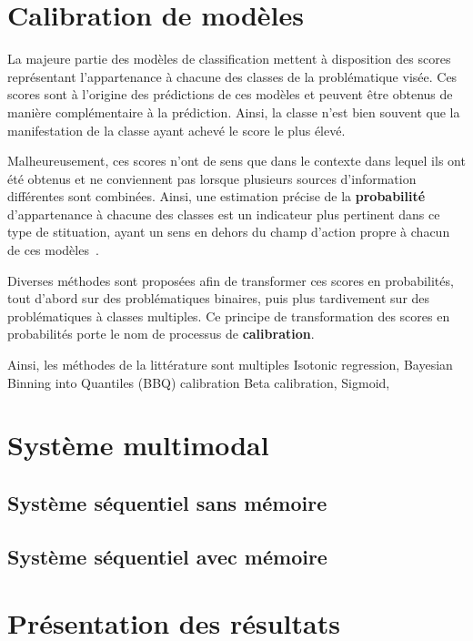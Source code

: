 \section{Calibration de modèles}
La majeure partie des modèles de classification mettent à disposition des scores représentant l'appartenance à chacune des classes de la problématique visée. Ces scores sont à l'origine des prédictions de ces modèles et peuvent être obtenus de manière complémentaire à la prédiction. Ainsi, la classe n'est bien souvent que la manifestation de la classe ayant achevé le score le plus élevé.\par

Malheureusement, ces scores n'ont de sens que dans le contexte dans lequel ils ont été obtenus et ne conviennent pas lorsque plusieurs sources d'information différentes sont combinées. Ainsi, une estimation précise de la \textbf{probabilité} d'appartenance à chacune des classes est un indicateur plus pertinent dans ce type de stituation, ayant un sens en dehors du champ d'action propre à chacun de ces modèles~\cite{Zadrozny2002}.\par

Diverses méthodes sont proposées afin de transformer ces scores en probabilités, tout d'abord sur des problématiques binaires, puis plus tardivement sur des problématiques à classes multiples. Ce principe de transformation des scores en probabilités porte le nom de processus de \textbf{calibration}.\par

Ainsi, les méthodes de la littérature sont multiples
Isotonic regression, \cite{Zadrozny2002}
Bayesian Binning into Quantiles (BBQ) calibration\cite{Naeini2015}
Beta calibration,\cite{Kull2017}
Sigmoid,\cite{kull2017b}

\section{Système multimodal}
\subsection{Système séquentiel sans mémoire}
\subsection{Système séquentiel avec mémoire}

\section{Présentation des résultats}
